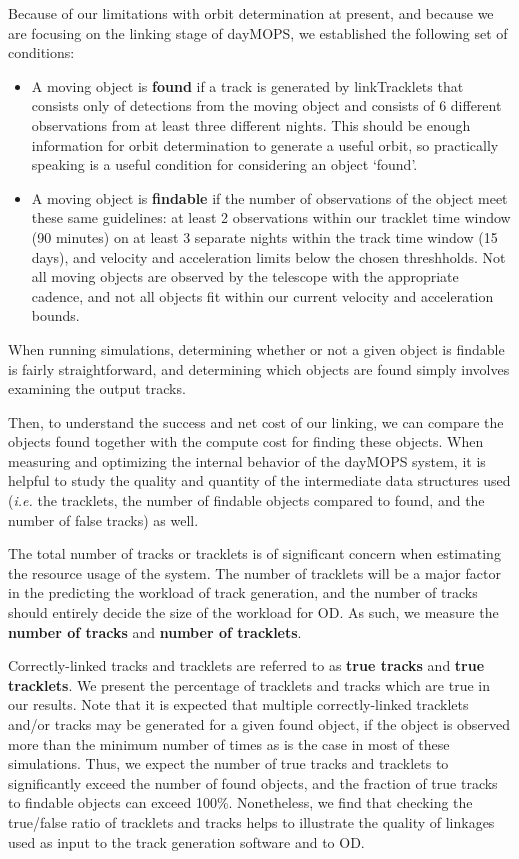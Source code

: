 Because of our limitations with orbit determination at present, and
because we are focusing on the linking stage of dayMOPS, we
established the following set of conditions: 
\begin{itemize}
\item{A moving object is \textbf{found} if a track is generated by
    linkTracklets that consists only of detections from the moving
    object and consists of 6 different observations from at least
    three different nights. This should be enough information for
    orbit determination to generate a useful orbit, so practically
    speaking is a useful condition for considering an object
    `found'. }
\item{A moving object is \textbf{findable} if the number of
    observations of the object meet these same guidelines: at least 2
    observations within our tracklet time window (90 minutes) on at
    least 3 separate nights within the track time window (15
    days), and velocity and acceleration limits below the chosen
    threshholds.  Not all moving objects are observed by the telescope
    with the appropriate cadence, and not all objects fit within our
    current velocity and acceleration bounds.}
\end{itemize}
When running simulations, determining whether or not a given object is
findable is fairly straightforward, and determining which objects are
found simply involves examining the output tracks. 

Then, to understand the success and net cost of our linking, we can
compare the objects found together with the compute cost for finding these
objects. When measuring and optimizing the internal behavior of the
dayMOPS system, it is helpful to study the quality and quantity of the
intermediate data structures used ({\it i.e.} the tracklets, the
number of findable objects compared to found, and the number of false
tracks) as well. 

The total number of tracks or tracklets is of significant concern when
estimating the resource usage of the system.  The number of tracklets
will be a major factor in the predicting the workload of track
generation, and the number of tracks should entirely decide the size
of the workload for OD.  As such, we measure the \textbf{number of
  tracks} and \textbf{number of tracklets}.  

Correctly-linked tracks and tracklets are referred to as \textbf{true
  tracks} and \textbf{true tracklets}. We present the percentage of
tracklets and tracks which are true in our results. Note that it is
expected that multiple correctly-linked tracklets and/or tracks may be
generated for a given found object, if the object is observed more
than the minimum number of times as is the case in most of these
simulations. Thus, we expect the number of
true tracks and tracklets to significantly exceed the number of found
objects, and the fraction of true tracks to findable objects can
exceed 100\%.  Nonetheless, we find that checking the true/false ratio of
tracklets and tracks helps to illustrate the quality of linkages used
as input to the track generation software and to OD.


